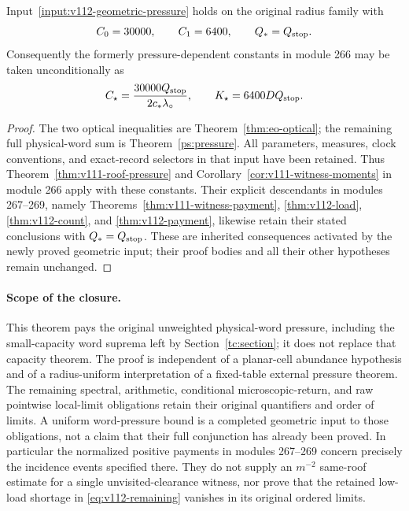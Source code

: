\begin{corollary}
\label{ps:input-complete}
Input~\ref{input:v112-geometric-pressure} holds on the original
radius family with
\[
        C_0=30000,\qquad C_1=6400,\qquad Q_*=Q_{\rm stop}.
\]
Consequently the formerly pressure-dependent constants in module 266
may be taken unconditionally as
\[
 C_\star={30000Q_{\rm stop}\over2c_*\lambda_\circ},
 \qquad K_\star=6400D Q_{\rm stop}.
\]
\end{corollary}
\begin{proof}
The two optical inequalities are
Theorem~\ref{thm:eo-optical}; the remaining full physical-word
sum is Theorem~\ref{ps:pressure}.
All parameters, measures, clock conventions, and exact-record
selectors in that input have been retained.
Thus Theorem~\ref{thm:v111-roof-pressure} and
Corollary~\ref{cor:v111-witness-moments} in module 266 apply with
these constants.  Their explicit descendants in modules 267--269,
namely Theorems~\ref{thm:v111-witness-payment},
\ref{thm:v112-load}, \ref{thm:v112-count}, and
\ref{thm:v112-payment}, likewise retain their stated conclusions
with $Q_*=Q_{\rm stop}$.  These are inherited consequences
activated by the newly proved geometric input; their proof bodies
and all their other hypotheses remain unchanged.
\end{proof}

\paragraph{Scope of the closure.}
This theorem pays the original unweighted physical-word pressure,
including the small-capacity word suprema left by
Section~\ref{tc:section}; it does not replace that capacity theorem.
The proof is independent of a planar-cell abundance hypothesis
and of a radius-uniform interpretation of a fixed-table external
pressure theorem.  The remaining spectral, arithmetic, conditional
microscopic-return, and raw pointwise local-limit obligations
retain their original quantifiers and order of limits.  A uniform
word-pressure bound is a completed geometric input to those
obligations, not a claim that their full conjunction has already
been proved.
In particular the normalized positive payments in modules
267--269 concern precisely the incidence events specified there.
They do not supply an $m^{-2}$ same-roof estimate for a single
unvisited-clearance witness, nor prove that the retained low-load
shortage in \eqref{eq:v112-remaining} vanishes in its original
ordered limits.

